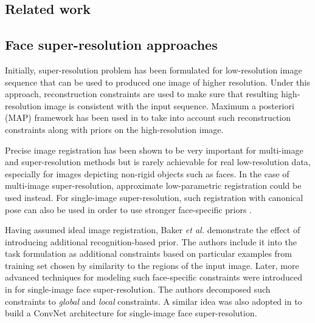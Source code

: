 \subsection{Related work}
\label{sec:related}

\subsection{Face super-resolution approaches}

Initially, super-resolution problem has been formulated for low-resolution image sequence that can be used to produced one image of higher resolution. Under this approach, reconstruction constraints are used to make sure that resulting high-resolution image is consistent with the input sequence. 
Maximum a posteriori (MAP) framework has been used in \cite{HardieBA97, SchultzS96, baker2002limits} to take into account such reconstruction constraints along with priors on the high-resolution image.

Precise image registration has been shown to be very important for multi-image \cite{HardieBA97, IraniP91, SchultzS96} and super-resolution methods but is rarely achievable for real  low-resolution data, especially for images depicting non-rigid objects such as faces. In the case of multi-image super-resolution, approximate low-parametric registration could be used instead. For single-image super-resolution, such registration with canonical pose can also be used in order to use stronger face-specific priors \cite{LiuSF07}.


Having assumed ideal image registration, Baker \emph{et al.} \cite{baker2002limits} demonstrate the effect of introducing additional recognition-based prior. The authors include it into the task formulation as additional constraints based on particular examples from  training set chosen by similarity to the regions of the input image.  Later, more advanced techniques for modeling such face-specific constraints were introduced in \cite{LiuSF07} for single-image face super-resolution. The authors decomposed such constraints to \emph{global} and \emph{local} constraints. A similar idea was also adopted in \cite{TuzelTH16} to build a ConvNet architecture for single-image face super-resolution.



